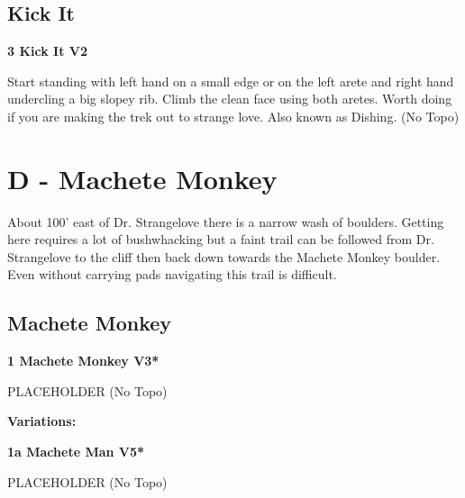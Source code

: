 \begin{multicols}{2}
\needspace{1.5cm}
\subsection*{Kick It}\label{bf:Kick It}
	


\needspace{1.5cm}
\label{rt:Kick It}
\colorbox{green!20}{
\parbox{0.95\linewidth}{
\textbf{
3 Kick It V2  
}}}
\begin{adjustwidth}{0.5cm}{}			
Start standing with left hand on a small edge or on the left arete and right hand undercling a big slopey rib. Climb the clean face using both aretes. Worth doing if you are making the trek out to strange love. Also known as Dishing.
  (No Topo)
\end{adjustwidth}





\newpage

\section{D - Machete Monkey}\label{sa:Machete Monkey}
About 100' east of Dr. Strangelove there is a narrow wash of boulders. Getting here requires a lot of bushwhacking but a faint trail can be followed from Dr. Strangelove to the cliff then back down towards the Machete Monkey boulder. Even without carrying pads navigating this trail is difficult.\\




\needspace{1.5cm}
\subsection*{Machete Monkey}\label{bf:Machete Monkey}
	


\needspace{1.5cm}
\label{rt:Machete Monkey}
\colorbox{green!20}{
\parbox{0.95\linewidth}{
\textbf{
1 Machete Monkey V3*  
}}}
\begin{adjustwidth}{0.5cm}{}			
PLACEHOLDER
  (No Topo)
\end{adjustwidth}


\begin{adjustwidth}{0.5cm}{}				
\needspace{3cm}
\textbf{Variations:} \newline

\needspace{1.5cm}
\label{vr:Machete Man}
\colorbox{RoyalBlue!20}{
\parbox{0.95\linewidth}{
\textbf{
1a Machete Man V5*  
}}}
\begin{adjustwidth}{0.5cm}{}			
PLACEHOLDER
  (No Topo)
\end{adjustwidth}




\end{adjustwidth}
\end{multicols}

